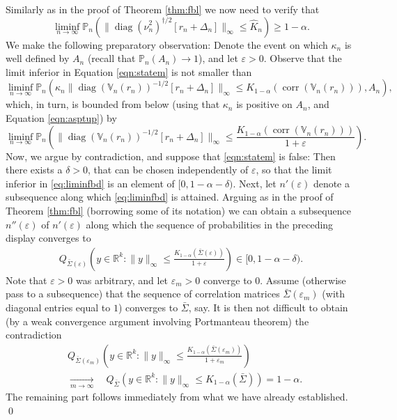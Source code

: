 \documentclass[preprint]{imsart}
\newcommand{\R}{{\mathbb R}}
\newcommand{\eps}{\varepsilon}
\DeclareMathOperator{\diag}{diag}
\DeclareMathOperator{\corr}{corr}
\numberwithin{equation}{section}
\begin{document}
Similarly as in the proof of Theorem \ref{thm:fbl} we now need to verify that
%
\begin{equation}\label{eqn:statem}
\liminf_{n \to \infty} \mathbb{P}_n \left( \| \diag(\hat{\nu}^2_n)^{\dagger/2} \left[r_n + \Delta_n \right]\|_{\infty} \leq \hat{K}_n \right) \geq 1- \alpha.
\end{equation}
%
We make the following preparatory observation: Denote the event on which $\kappa_n$ is well defined by $A_n$ (recall that $\mathbb{P}_n(A_n) \to 1$), and let $\eps > 0$. Observe that the limit inferior in Equation \eqref{eqn:statem} is not smaller than
%
\begin{equation}
\liminf_{n \to \infty}
 \mathbb{P}_n \left( \kappa_n \| \diag(\mathbb{V}_n(r_n))^{-1/2} \left[r_n + \Delta_n \right] \|_{\infty} \leq  K_{1-\alpha}(\corr(\mathbb{V}_n(r_n))), A_n \right),
\end{equation}
%
which, in turn, is bounded from below (using that $\kappa_n$ is positive on $A_n$, and Equation \eqref{eqn:asptup}) by
%
\begin{equation}\label{eq:liminfbd}
\liminf_{n \to \infty} \mathbb{P}_n \left( \| \diag(\mathbb{V}_n(r_n))^{-1/2} \left[r_n + \Delta_n \right] \|_{\infty} \leq \frac{K_{1-\alpha}(\corr(\mathbb{V}_n(r_n)))}{1 + \eps} \right).
\end{equation}
%
Now, we argue by contradiction, and suppose that \eqref{eqn:statem} is false: Then there exists a $\delta > 0$, that can be chosen independently of $\eps$, so that the limit inferior in \eqref{eq:liminfbd} is an element of $[0, 1-\alpha - \delta)$. Next, let $n'(\eps)$ denote a subsequence along which \eqref{eq:liminfbd} is attained. Arguing as in the proof of Theorem \ref{thm:fbl} (borrowing some of its notation) we can obtain a subsequence $n''(\eps)$ of $n'(\eps)$ along which the sequence of probabilities in the preceding display converges to
%
\begin{align}
Q_{\bar{\Sigma}(\eps)}\left(y \in \R^k: \|y\|_{\infty} \leq \frac{K_{1-\alpha}(\bar{\Sigma}(\eps))}{1+\eps} \right) \in [0, 1-\alpha - \delta).
\end{align}
%
Note that $\eps > 0$ was arbitrary, and let $\eps_m > 0$ converge to $0$. Assume (otherwise pass to a subsequence) that the sequence of correlation matrices $\bar{\Sigma}(\eps_m)$ (with diagonal entries equal to $1$) converges to $\bar{\Sigma}$, say. It is then not difficult to obtain (by a weak convergence argument involving Portmanteau theorem) the contradiction 
%
\begin{align}
& Q_{\bar{\Sigma}(\eps_m)}\left(y \in \R^k: \|y\|_{\infty} \leq \frac{K_{1-\alpha}(\bar{\Sigma}(\eps_m))}{1+\eps_m} \right) \\ 
&\xrightarrow[m\to\infty]{} \quad  Q_{\bar{\Sigma}}\left(y \in \R^k: \|y\|_{\infty} \leq K_{1-\alpha}(\bar{\Sigma}) \right) = 1-\alpha.
\end{align}
%
The remaining part follows immediately from what we have already established. \hfill\qed
\end{document}
